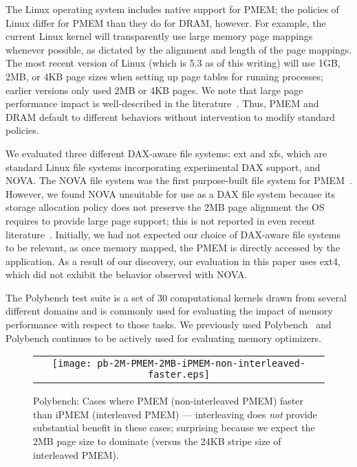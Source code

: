 The Linux operating system includes native support for PMEM; the policies of Linux differ for PMEM than they do for DRAM, however.  For example, the current Linux kernel will transparently use large memory page mappings whenever possible, as dictated by the alignment and length of the page mappings.  The most recent version of Linux (which is 5.3 as of this writing) will use 1GB, 2MB, or 4KB page sizes when setting up page tables for running processes; earlier versions only used 2MB or 4KB pages. We note that large page performance impact is well-described in the literature~\cite{agarwal2017thermostat,panwar2018making}.  Thus, PMEM and DRAM default to different behaviors without  intervention to modify standard policies.

We evaluated three different DAX-aware file systems: ext and xfs, which are standard Linux file systems incorporating experimental DAX support, and NOVA. The NOVA file system was the first purpose-built file system for PMEM~\cite{xu2016nova}.  However, we found NOVA unsuitable for use as a DAX file system because its storage allocation policy does not preserve the 2MB page alignment the OS requires to provide large page support; this is not reported in even recent literature~\cite{izraelevitz2019basic,yang2019empirical}. Initially, we had not expected our choice of DAX-aware file systems to be relevant, as once memory mapped, the PMEM is directly accessed by the application.  As a result of our discovery, our evaluation in this paper uses ext4, which did not exhibit the behavior observed with NOVA.


The Polybench test suite is a set of 30 computational kernels drawn from several different domains and is commonly used for evaluating the impact of memory performance with respect to those tasks. We previously used Polybench~\cite{doudali2017comerge} and Polybench continues to be actively used for evaluating memory optimizers.

\begin{figure}[!bh]
  \captionsetup{justification=centering}
  \centering
  \caption{Polybench: Cases where PMEM (non-interleaved PMEM) faster than iPMEM (interleaved PMEM) --- interleaving does \textit{not} provide substantial benefit in these cases; surprising because we expect the 2MB page size to dominate (versus the 24KB stripe size of interleaved PMEM).}
  \vspace{2mm}
  \label{fig:polybench:PMEM-vs-ipmem}
  \begin{tabular}{c}
    \texttt{[image: pb-2M-PMEM-2MB-iPMEM-non-interleaved-faster.eps]}
  \end{tabular}
\end{figure}



